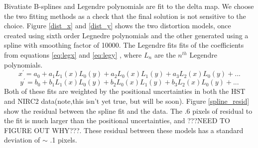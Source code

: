 Bivatiate B-splines and Legendre polynomials are fit to the delta map.  We choose the two fitting methods as a check that the final solution is not sensitive to the choice.  Figure \ref{dist_x} and \ref{dist_y} shows the two distortion models, once created using sixth order Legnedre polynomials and the other generated using a spline with smoothing factor of 10000.  The Legendre fits fits of the coefficients from equations \ref{eq:legx} and \ref{eq:legy} , where $L_{n}$ are the $n^{th}$ Legendre polynomials.  
\begin{equation}
x^{'} = a_{0} + a_{1}L_{1}(x)L_{0}(y) +  a_{2}L_{0}(x)L_{1}(y) + a_{3}L_{2}(x)L_{0}(y)+...
\label{eg:legx}
\end{equation}
\begin{equation}
y^{'} = b_{0} + b_{1}L_{1}(x)L_{0}(y) +  b_{2}L_{0}(x)L_{1}(y) + b_{3}L_{2}(x)L_{0}(y)+...
\label{eq:legy}
\end{equation}
Both of these fits are weighted by the positional uncertainties in both the HST and NIRC2 data(note,this isn't yet true, but will be soon). Figure \ref{spline_resid} show the residual between the spline fit and the data.  The .6 pixels of residual to the fit is much larger than the positional uncertainties, and ???NEED TO FIGURE OUT WHY???.  These residual between these models has a standard deviation of $\sim$ .1 pixels.
